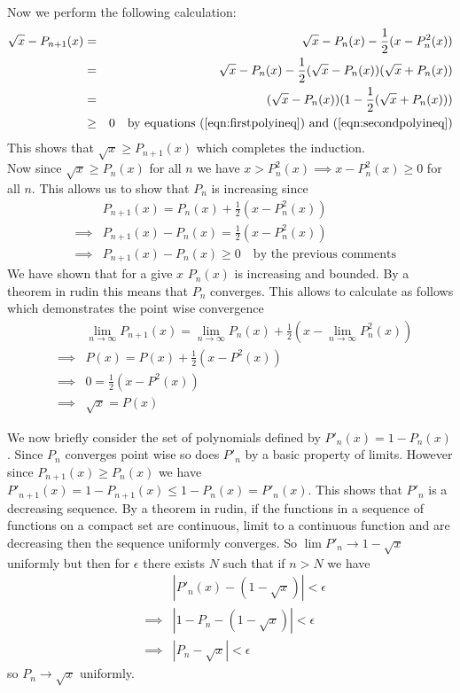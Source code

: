 \documentclass[11pt,reqno]{article}
\begin{document}
\noindent Now we perform the following calculation:
\begin{eqnarray*}
\sqrt{x} - P_{n+1}(x) &=& \sqrt{x} - P_n(x) - \frac{1}{2}(x - P_n^2(x))\\
			       &=& \sqrt{x} - P_n(x) - \frac{1}{2}(\sqrt{x} - P_n(x))(\sqrt{x} + P_n(x))\\
			       &=& (\sqrt{x} - P_n(x))(1 - \frac{1}{2}(\sqrt{x} + P_n(x)))\\
			       &\ge& 0 \quad \text{by equations (\ref{eqn:firstpolyineq}) and (\ref{eqn:secondpolyineq})}
\end{eqnarray*}
This shows that $\sqrt{x} \ge P_{n+1}(x)$ which completes the induction.\\
Now since $\sqrt{x} \ge P_n(x)$ for all $n$ we have $x > P_n^2(x) \implies x - P_n^2(x) \ge 0$ for all $n$.  This allows us to show that $P_n$ is increasing since 
\begin{eqnarray*}
&& P_{n+1}(x) = P_n(x) + \frac{1}{2} (x - P_n^2(x)) \\
&\implies& P_{n+1}(x) - P_n(x) = \frac{1}{2} (x - P_n^2(x))  \\ 
&\implies & P_{n+1}(x) - P_n(x) \ge 0 \quad \text{by the previous comments}
\end{eqnarray*}
We have shown that for a give $x$ $P_n(x)$ is increasing and bounded. By a theorem in rudin this means that $P_n$ converges. This allows to calculate as follows which demonstrates the point wise convergence
\begin{eqnarray*}
&& \lim_{n \to \infty} P_{n+1}(x) = \lim_{n \to \infty} P_n(x) + \frac{1}{2} (x - \lim_{n \to \infty} P_n^2(x))\\
&\implies& P(x) = P(x) + \frac{1}{2} (x - P^2(x)) \\
&\implies& 0 = \frac{1}{2} (x - P^2(x)) \\ 
&\implies& \sqrt{x} = P(x)
\end{eqnarray*}

\indent We now briefly consider the set of polynomials defined by $P'_n(x) = 1 - P_n(x)$. Since $P_n$ converges point wise so does $P'_n$ by a basic property of limits. However since $P_{n+1}(x) \ge P_n(x)$ we have \\$P'_{n+1}(x) = 1 - P_{n+1}(x) \le 1 - P_n(x) = P'_n(x)$. This shows that $P'_n$ is a decreasing sequence. By a theorem in rudin, if the functions in a sequence of functions on a compact set are continuous, limit to a continuous function and are decreasing then the sequence uniformly converges. So $\lim P'_n \to 1 - \sqrt{x}$ uniformly but then for $\epsilon$ there exists $N$ such that if $n > N$ we have 
\begin{eqnarray*} 
&& |P'_n(x) - (1 - \sqrt{x})| < \epsilon \\
&\implies& |1 - P_n - (1 - \sqrt{x})| < \epsilon \\
&\implies& |P_n - \sqrt{x}| < \epsilon
\end{eqnarray*}
so $P_n \to \sqrt{x}$ uniformly. \\
\end{document}
